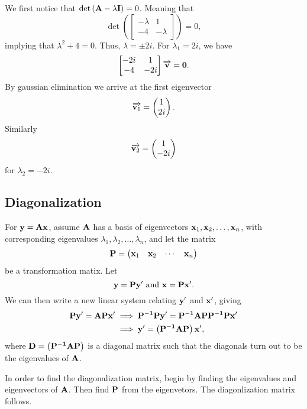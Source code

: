 \documentclass[12pt]{scrartcl}
\begin{document}
\noindent{}We first notice that $\det \left(\bold{A} - \lambda \bold{I}\right) = 0$. Meaning that
$$\det \left(\begin{bmatrix} -\lambda & 1 \\ -4 & -\lambda \end{bmatrix}\right) = 0,$$
implying that $\lambda^2+4 = 0$. Thus, $\lambda = \pm 2i$. For $\lambda_1 = 2i$, we have
$$\begin{bmatrix} -2i & 1 \\ -4 & -2i \end{bmatrix} \overrightarrow{\bold{v}} = \bold{0}.$$
By gaussian elimination we arrive at the first eigenvector $$\overrightarrow{\bold{v}_1} = \begin{pmatrix} 1 \\ 2i \end{pmatrix}.$$ Similarly $$\overrightarrow{\bold{v}_2} = \begin{pmatrix} 1 \\ -2i \end{pmatrix}$$ for $\lambda_2 = -2i$.

\newpage
\subsection{Diagonalization}
For $\bold{y} = \bold{A} \bold{x}$, assume $\bold{A}$ has
a basis of eigenvectors $\bold{x}_1,\bold{x}_2, \dots, 
\bold{x}_n$, with corresponding eigenvalues $\lambda_1, \lambda_2, \dots, \lambda_n$, and let
the matrix $$\bold{P} = \begin{pmatrix} \bold{x}_1 & \bold{x}_2 & \cdots & \bold{x}_n \end{pmatrix}$$ be a transformation matix.
Let $$\bold{y} = \bold{P} \bold{y}' ~ \text{and} ~ \bold{x} = \bold{P} \bold{x}'.$$
We can then write a new linear system relating $\bold{y}'$ and $\bold{x}'$, giving
\begin{align*}
    \bold{P}\bold{y}' = \bold{A}\bold{P} \bold{x}' &\implies \bold{P^{-1}}\bold{P}\bold{y}' = \bold{P^{-1}}\bold{A}\bold{P}\bold{P^{-1}}\bold{P}\bold{x}' \\
&\implies \bold{y}' = \left ( \bold{P^{-1}}\bold{A}\bold{P} \right) \bold{x}',
\end{align*}
where $ \bold{D} = \left ( \bold{P^{-1}}\bold{A}\bold{P} \right) $ is a diagonal matrix such that the diagonals turn out to be the eigenvalues of $\bold{A}$.

\begin{remark}
    In order to find the diagonalization matrix, begin by finding the eigenvalues and eigenvectors of $\bold{A}$. Then find $\bold{P}$ from the eigenvetors. The diagonlization matrix follows.
\end{remark}
\end{document}
